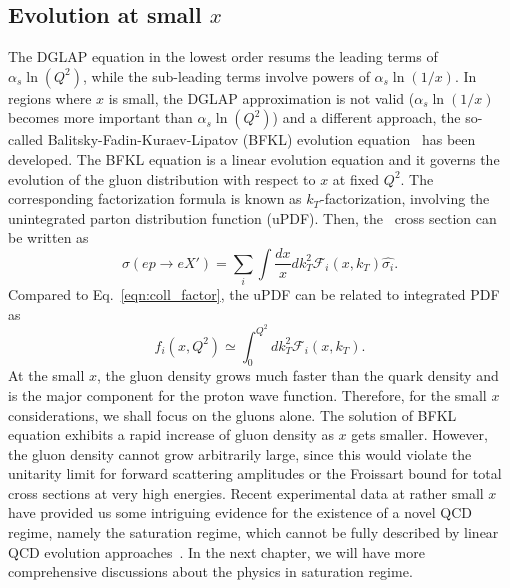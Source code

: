 \subsection{Evolution at small $x$}
The DGLAP equation in the lowest order resums the leading terms of
$\alpha_{s}\ln(Q^{2})$, while the sub-leading terms involve powers of
$\alpha_{s}\ln(1/x)$. In regions where $x$ is small, the DGLAP approximation is
not valid ($\alpha_{s}\ln(1/x)$ becomes more important than
$\alpha_{s}\ln(Q^{2})$) and a different approach, the so-called
Balitsky-Fadin-Kuraev-Lipatov (BFKL) evolution equation~\cite{Balitsky:1978ic}
has been developed. The BFKL equation is a linear evolution equation and it
governs the evolution of the gluon distribution with respect to $x$ at fixed
$Q^{2}$. The corresponding factorization formula is known as
$k_{T}$-factorization, involving the unintegrated parton distribution function
(uPDF). Then, the \ep\ cross section can be written as
\begin{equation}
\sigma(ep\rightarrow eX')=\sum_{i} \int\frac{dx}{x}dk_{T}^{2}\mathcal{F}_{i}(x,k_{T})\hat{\sigma_{i}}.
\end{equation}
Compared to Eq.~\ref{eqn:coll_factor}, the uPDF can be related to integrated PDF
as \[f_{i}(x,Q^{2})\simeq \int^{Q^{2}}_{0}dk_{T}^{2}\mathcal{F}_{i}(x,k_{T}).\]
At the small $x$, the gluon density grows much faster than the quark density and
is the major component for the proton wave function. Therefore, for the small
$x$ considerations, we shall focus on the gluons alone. The solution of BFKL
equation exhibits a rapid increase of gluon density as $x$ gets smaller.
However, the gluon density cannot grow arbitrarily large, since this would
violate the unitarity limit for forward scattering amplitudes or the Froissart
bound for total cross sections at very high energies. Recent experimental data
at rather small $x$ have provided us some intriguing evidence for the existence
of a novel QCD regime, namely the saturation regime, which cannot be fully
described by linear QCD evolution
approaches~\cite{Stasto:2000er,Armesto:2004ud,Gelis:2010nm}. In the next
chapter, we will have more comprehensive discussions about the physics in
saturation regime.





